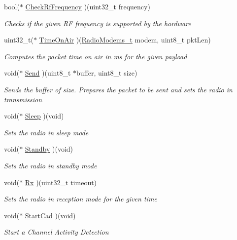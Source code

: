 \begin{DoxyCompactItemize}
bool($\ast$ \mbox{\hyperlink{struct_radio__s_a984f224d5ef26fb8a35f77d664f384df}{Check\+Rf\+Frequency}} )(uint32\+\_\+t frequency)
\begin{DoxyCompactList}\small\item\em Checks if the given RF frequency is supported by the hardware \end{DoxyCompactList}\item 
uint32\+\_\+t($\ast$ \mbox{\hyperlink{struct_radio__s_a030d3e891a70725d55e6e547e00f9278}{Time\+On\+Air}} )(\mbox{\hyperlink{radio_8h_a992ef7a5b7f52975ba7bd8dd97740057}{Radio\+Modems\+\_\+t}} modem, uint8\+\_\+t pkt\+Len)
\begin{DoxyCompactList}\small\item\em Computes the packet time on air in ms for the given payload \end{DoxyCompactList}\item 
void($\ast$ \mbox{\hyperlink{struct_radio__s_a84c3ad8e921fef613c838563197adc6c}{Send}} )(uint8\+\_\+t $\ast$buffer, uint8\+\_\+t size)
\begin{DoxyCompactList}\small\item\em Sends the buffer of size. Prepares the packet to be sent and sets the radio in transmission \end{DoxyCompactList}\item 
void($\ast$ \mbox{\hyperlink{struct_radio__s_a5792613816e79c465be4169c0bc020cb}{Sleep}} )(void)
\begin{DoxyCompactList}\small\item\em Sets the radio in sleep mode \end{DoxyCompactList}\item 
void($\ast$ \mbox{\hyperlink{struct_radio__s_ad1d3253de93d8fd1eee59da2a1c794ec}{Standby}} )(void)
\begin{DoxyCompactList}\small\item\em Sets the radio in standby mode \end{DoxyCompactList}\item 
void($\ast$ \mbox{\hyperlink{struct_radio__s_a28354465b3df8db25bd766e54c96d837}{Rx}} )(uint32\+\_\+t timeout)
\begin{DoxyCompactList}\small\item\em Sets the radio in reception mode for the given time \end{DoxyCompactList}\item 
void($\ast$ \mbox{\hyperlink{struct_radio__s_a6896222d46a4b809dde1e916ee6d5d6b}{Start\+Cad}} )(void)
\begin{DoxyCompactList}\small\item\em Start a Channel Activity Detection \end{DoxyCompactList}\item 

\end{DoxyCompactItemize}
